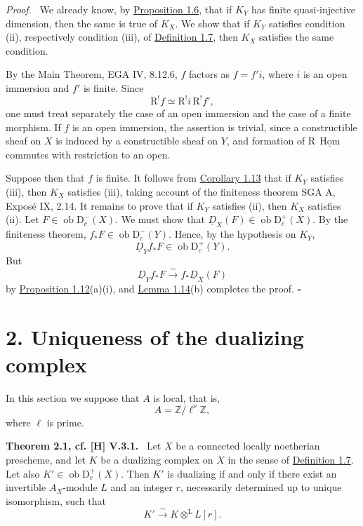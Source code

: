 \documentclass[11pt]{article}
\providecommand{\qedtext}{\hfill$\square$}
\providecommand{\ZZ}{\mathbb{Z}}
\newenvironment{statement}[1]{\par\medskip\noindent\textbf{#1.}\ }{\par\medskip}
\newenvironment{prooftext}[1][Proof]{\par\noindent\emph{#1.}\ }{\par\medskip}
\DeclareMathOperator{\Hom}{Hom}
\newcommand{\R}{\mathrm{R}}
\newcommand{\D}{\mathrm{D}}
\newcommand{\ob}{\operatorname{ob}}
\providecommand{\Hom}{\operatorname{Hom}}
\providecommand{\ob}{\operatorname{ob}}
\providecommand{\R}{\mathrm R}
\providecommand{\Hom}{\operatorname{Hom}}
\providecommand{\qedtext}{\hfill$\square$}
\begin{document}
\begin{prooftext}
We already know, by \hyperref[sga5:I:proposition:1.6]{Proposition 1.6}, that if $K_Y$ has finite quasi-injective dimension, then the same is true of $K_X$. We show that if $K_Y$ satisfies condition (ii), respectively condition (iii), of \hyperref[sga5:I:definition:1.7]{Definition 1.7}, then $K_X$ satisfies the same condition.

By the Main Theorem, EGA IV, 8.12.6, $f$ factors as $f=f'i$, where $i$ is an open immersion and $f'$ is finite. Since
\[
   \R^!f\simeq\R^!i\,\R^!f',
\]
one must treat separately the case of an open immersion and the case of a finite morphism. If $f$ is an open immersion, the assertion is trivial, since a constructible sheaf on $X$ is induced by a constructible sheaf on $Y$, and formation of $\R\,\underline{\Hom}$ commutes with restriction to an open.

Suppose then that $f$ is finite. It follows from \hyperref[sga5:I:corollary:1.13]{Corollary 1.13} that if $K_Y$ satisfies (iii), then $K_X$ satisfies (iii), taking account of the finiteness theorem SGA A, Exposé IX, 2.14. It remains to prove that if $K_Y$ satisfies (ii), then $K_X$ satisfies (ii). Let $F\in\ob\D_c^-(X)$. We must show that $\underline D_X(F)\in\ob\D_c^+(X)$. By the finiteness theorem, $f_*F\in\ob\D_c^-(Y)$. Hence, by the hypothesis on $K_Y$,
\[
   \underline D_Y f_*F\in\ob\D_c^+(Y).
\]
But
\[
   \underline D_Y f_*F\xrightarrow{\sim}f_*\underline D_X(F)
\]
by \hyperref[sga5:I:proposition:1.12]{Proposition 1.12}(a)(i), and \hyperref[sga5:I:lemma:1.14]{Lemma 1.14}(b) completes the proof. \qedtext
\end{prooftext}



\section*{2. Uniqueness of the dualizing complex}\label{sga5:I:section:2}

In this section we suppose that $A$ is local, that is,
\[
   A=\ZZ/\ell^\nu\ZZ,
\]
where $\ell$ is prime.

\label{sga5:I:theorem:2.1}\begin{statement}{Theorem 2.1, cf. [H] V.3.1}
Let $X$ be a connected locally noetherian prescheme, and let $K$ be a dualizing complex on $X$ in the sense of \hyperref[sga5:I:definition:1.7]{Definition 1.7}. Let also $K'\in\ob\D_c^+(X)$. Then $K'$ is dualizing if and only if there exist an invertible $A_X$-module $L$ and an integer $r$, necessarily determined up to unique isomorphism, such that
\[
   K'\xrightarrow{\sim}K\otimes^{\mathrm L}L[r].
\]
\end{statement}
\end{document}
